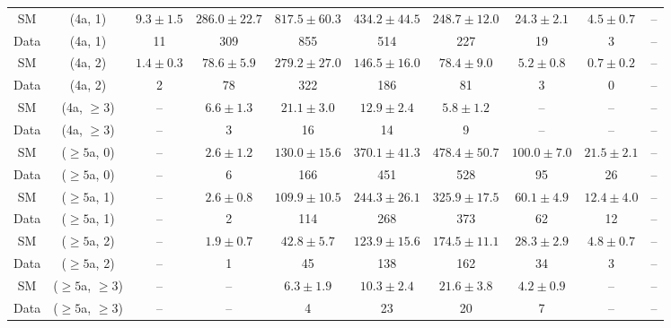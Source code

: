 \begin{table}[h!]
{\begin{tabular}{cccccccccc}
	SM & (4a, 1) & $9.3\pm 1.5$ & $286.0\pm 22.7$ & $817.5\pm 60.3$ & $434.2\pm 44.5$ & $248.7\pm 12.0$ & $24.3\pm 2.1$ & $4.5\pm 0.7$ & -- \\[0.5ex] 
	Data & (4a, 1) & 11 & 309 & 855 & 514 & 227 & 19 & 3 & -- \\[0.5ex] 
	SM & (4a, 2) & $1.4\pm 0.3$ & $78.6\pm 5.9$ & $279.2\pm 27.0$ & $146.5\pm 16.0$ & $78.4\pm 9.0$ & $5.2\pm 0.8$ & $0.7\pm 0.2$ & -- \\[0.5ex] 
	Data & (4a, 2) & 2 & 78 & 322 & 186 & 81 & 3 & 0 & -- \\[0.5ex] 
	SM & (4a, $\ge3$) & -- & $6.6\pm 1.3$ & $21.1\pm 3.0$ & $12.9\pm 2.4$ & $5.8\pm 1.2$ & -- & -- & -- \\[0.5ex] 
	Data & (4a, $\ge3$) & -- & 3 & 16 & 14 & 9 & -- & -- & -- \\[0.5ex] 
	SM & ($\ge5$a, 0) & -- & $2.6\pm 1.2$ & $130.0\pm 15.6$ & $370.1\pm 41.3$ & $478.4\pm 50.7$ & $100.0\pm 7.0$ & $21.5\pm 2.1$ & -- \\[0.5ex] 
	Data & ($\ge5$a, 0) & -- & 6 & 166 & 451 & 528 & 95 & 26 & -- \\[0.5ex] 
	SM & ($\ge5$a, 1) & -- & $2.6\pm 0.8$ & $109.9\pm 10.5$ & $244.3\pm 26.1$ & $325.9\pm 17.5$ & $60.1\pm 4.9$ & $12.4\pm 4.0$ & -- \\[0.5ex] 
	Data & ($\ge5$a, 1) & -- & 2 & 114 & 268 & 373 & 62 & 12 & -- \\[0.5ex] 
	SM & ($\ge5$a, 2) & -- & $1.9\pm 0.7$ & $42.8\pm 5.7$ & $123.9\pm 15.6$ & $174.5\pm 11.1$ & $28.3\pm 2.9$ & $4.8\pm 0.7$ & -- \\[0.5ex] 
	Data & ($\ge5$a, 2) & -- & 1 & 45 & 138 & 162 & 34 & 3 & -- \\[0.5ex] 
	SM & ($\ge5$a, $\ge3$) & -- & -- & $6.3\pm 1.9$ & $10.3\pm 2.4$ & $21.6\pm 3.8$ & $4.2\pm 0.9$ & -- & -- \\[0.5ex] 
	Data & ($\ge5$a, $\ge3$) & -- & -- & 4 & 23 & 20 & 7 & -- & -- \\[0.5ex] 
	\hline
	\hline
\end{tabular}}
\end{table}
